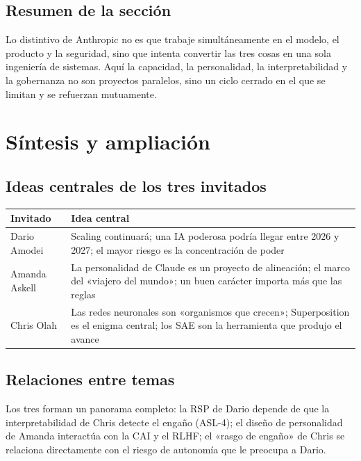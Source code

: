 \documentclass[a4paper]{article}
\begin{document}
\subsection{Resumen de la sección}

Lo distintivo de Anthropic no es que trabaje simultáneamente en el modelo, el producto y la seguridad, sino que intenta convertir las tres cosas en una sola ingeniería de sistemas. Aquí la capacidad, la personalidad, la interpretabilidad y la gobernanza no son proyectos paralelos, sino un ciclo cerrado en el que se limitan y se refuerzan mutuamente.

\section{Síntesis y ampliación}

\subsection{Ideas centrales de los tres invitados}

\begin{table}[H]
\centering
\begin{tabular}{lp{10cm}}
\toprule
\textbf{Invitado} & \textbf{Idea central} \\
\midrule
Dario Amodei & Scaling continuará; una IA poderosa podría llegar entre 2026 y 2027; el mayor riesgo es la concentración de poder \\
Amanda Askell & La personalidad de Claude es un proyecto de alineación; el marco del «viajero del mundo»; un buen carácter importa más que las reglas \\
Chris Olah & Las redes neuronales son «organismos que crecen»; Superposition es el enigma central; los SAE son la herramienta que produjo el avance \\
\bottomrule
\end{tabular}
\end{table}

\subsection{Relaciones entre temas}

Los tres forman un panorama completo: la RSP de Dario depende de que la interpretabilidad de Chris detecte el engaño (ASL-4); el diseño de personalidad de Amanda interactúa con la CAI y el RLHF; el «rasgo de engaño» de Chris se relaciona directamente con el riesgo de autonomía que le preocupa a Dario.
\end{document}
